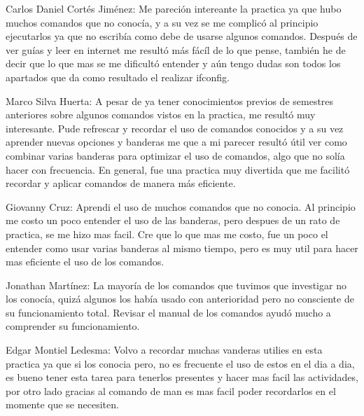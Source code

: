 \begin{center}

    \item Carlos Daniel Cortés Jiménez: Me pareción intereante la practica ya que hubo muchos comandos que no conocía, y a su vez se me complicó al principio ejecutarlos ya que no escribía como debe de usarse algunos comandos. Después de ver guías y leer en internet me resultó más fácíl de lo que pense, también he de decir que lo que mas se me dificultó entender y aún tengo dudas son todos los apartados que da como resultado el realizar ifconfig.
    
    \item Marco Silva Huerta: A pesar de ya tener conocimientos previos de semestres anteriores sobre algunos comandos vistos en la practica, me resultó muy interesante. Pude refrescar y recordar el uso de comandos conocidos y a su vez aprender nuevas opciones y banderas me que a mi parecer resultó útil ver como combinar varias banderas para optimizar el uso de comandos, algo que no solía hacer con frecuencia. En general, fue una practica muy divertida que me facilitó recordar y aplicar comandos de manera más eficiente.
    
    \item Giovanny Cruz: Aprendi el uso de muchos comandos que no conocia. Al principio me costo un poco entender el uso de las banderas,
            pero despues de un rato de practica, se me hizo mas facil. Cre que lo que mas me costo, fue un poco el entender como usar varias 
            banderas al mismo tiempo, pero es muy util para hacer mas eficiente el uso de los comandos.

    \item Jonathan Martínez: La mayoría de los comandos que tuvimos que investigar no los conocía, quizá algunos los había usado con 
            anterioridad pero no consciente de su funcionamiento total. Revisar el manual de los comandos ayudó mucho a comprender su 
            funcionamiento.

    \item Edgar Montiel Ledesma: Volvo a recordar muchas vanderas utilies en esta practica ya que si los conocia pero, no es frecuente el uso de estos en el dia a dia, es bueno tener esta tarea para tenerlos presentes y hacer mas facil las actividades, por otro lado gracias al comando de man es mas facil poder recordarlos en el momente que se necesiten.
    
\end{center}
